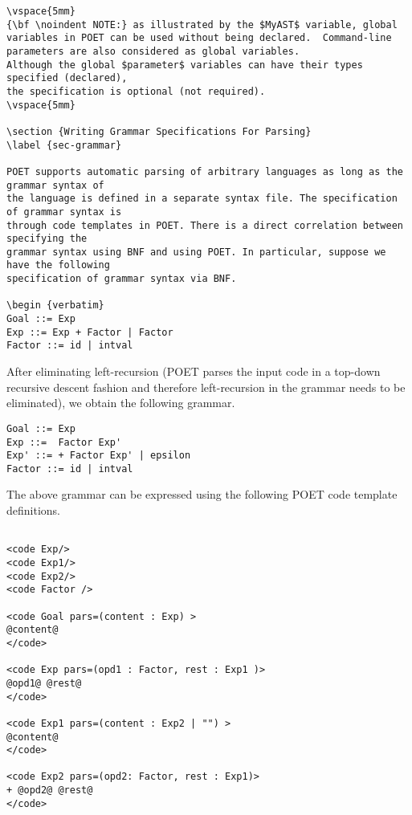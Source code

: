 \documentclass[11pt]{article}
\begin{document}
\begin {verbatim}
\vspace{5mm}
{\bf \noindent NOTE:} as illustrated by the $MyAST$ variable, global variables in POET can be used without being declared.  Command-line parameters are also considered as global variables.
Although the global $parameter$ variables can have their types specified (declared),
the specification is optional (not required).
\vspace{5mm}

\section {Writing Grammar Specifications For Parsing}
\label {sec-grammar}

POET supports automatic parsing of arbitrary languages as long as the grammar syntax of
the language is defined in a separate syntax file. The specification of grammar syntax is
through code templates in POET. There is a direct correlation between specifying the
grammar syntax using BNF and using POET. In particular, suppose we have the following
specification of grammar syntax via BNF.

\begin {verbatim}
Goal ::= Exp
Exp ::= Exp + Factor | Factor
Factor ::= id | intval
\end {verbatim} 

After eliminating left-recursion (POET parses the input code in a top-down recursive descent fashion
and therefore left-recursion in the grammar needs to be eliminated), we obtain the following grammar.

\begin {verbatim}
Goal ::= Exp
Exp ::=  Factor Exp'
Exp' ::= + Factor Exp' | epsilon
Factor ::= id | intval
\end {verbatim} 

The above grammar can be expressed using the following POET code template definitions.
\begin {verbatim}

<code Exp/>
<code Exp1/>
<code Exp2/>
<code Factor />

<code Goal pars=(content : Exp) >
@content@
</code>

<code Exp pars=(opd1 : Factor, rest : Exp1 )>
@opd1@ @rest@
</code>

<code Exp1 pars=(content : Exp2 | "") >
@content@
</code>

<code Exp2 pars=(opd2: Factor, rest : Exp1)>
+ @opd2@ @rest@
</code>


\end{verbatim}
\end{document}
